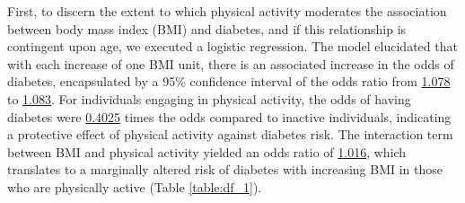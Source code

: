 \documentclass[11pt]{article}
\begin{document}
First, to discern the extent to which physical activity moderates the association between body mass index (BMI) and diabetes, and if this relationship is contingent upon age, we executed a logistic regression. The model elucidated that with each increase of one BMI unit, there is an associated increase in the odds of diabetes, encapsulated by a 95\% confidence interval of the odds ratio from \hyperlink{A1a}{1.078} to \hyperlink{A1b}{1.083}. For individuals engaging in physical activity, the odds of having diabetes were \hyperlink{A2c}{0.4025} times the odds compared to inactive individuals, indicating a protective effect of physical activity against diabetes risk. The interaction term between BMI and physical activity yielded an odds ratio of \hyperlink{A3c}{1.016}, which translates to a marginally altered risk of diabetes with increasing BMI in those who are physically active (Table \ref{table:df_1}).

\end{document}
